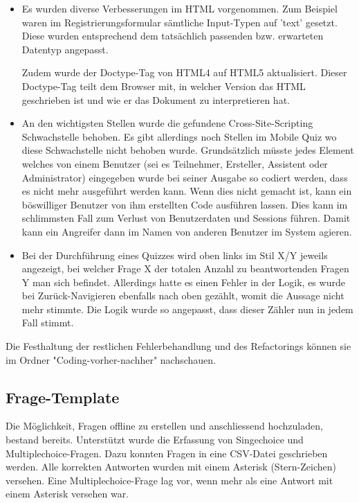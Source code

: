 \begin{itemize}
	\item Es wurden diverse Verbesserungen im HTML vorgenommen. Zum Beispiel waren im Registrierungsformular sämtliche Input-Typen auf 'text' gesetzt. Diese wurden entsprechend dem tatsächlich passenden bzw. erwarteten Datentyp angepasst.
	
	Zudem wurde der Doctype-Tag von HTML4 auf HTML5 aktualisiert. Dieser Doctype-Tag teilt dem Browser mit, in welcher Version das HTML geschrieben ist und wie er das Dokument zu interpretieren hat.
	
	\item An den wichtigsten Stellen wurde die gefundene \gls{Cross-Site-Scripting} Schwachstelle behoben. Es gibt allerdings noch Stellen im Mobile Quiz wo diese Schwachstelle nicht behoben wurde. Grundsätzlich müsste jedes Element welches von einem Benutzer (sei es Teilnehmer, Ersteller, Assistent oder Administrator) eingegeben wurde bei seiner Ausgabe so codiert werden, dass es nicht mehr ausgeführt werden kann. Wenn dies nicht gemacht ist, kann ein böswilliger Benutzer von ihm erstellten Code ausführen lassen. Dies kann im schlimmsten Fall zum Verlust von Benutzerdaten und Sessions führen. Damit kann ein Angreifer dann im Namen von anderen Benutzer im System agieren.
	
	\item Bei der Durchführung eines Quizzes wird oben links im Stil X/Y jeweils angezeigt, bei welcher Frage X der totalen Anzahl zu beantwortenden Fragen Y man sich befindet. Allerdings hatte es einen Fehler in der Logik, es wurde bei Zurück-Navigieren ebenfalls nach oben gezählt, womit die Aussage nicht mehr stimmte.
	Die Logik wurde so angepasst, dass dieser Zähler nun in jedem Fall stimmt. 
	
\end{itemize}

Die Festhaltung der restlichen Fehlerbehandlung und des Refactorings können sie im Ordner "Coding-vorher-nachher" nachschauen.

\subsection{Frage-Template}
Die Möglichkeit, Fragen offline zu erstellen und anschliessend hochzuladen, bestand bereits. Unterstützt wurde die Erfassung von Singechoice und Multiplechoice-Fragen. Dazu konnten Fragen in eine CSV-Datei geschrieben werden. Alle korrekten Antworten wurden mit einem Asterisk (Stern-Zeichen) versehen. Eine Multiplechoice-Frage lag vor, wenn mehr als eine Antwort mit einem Asterisk versehen war.

